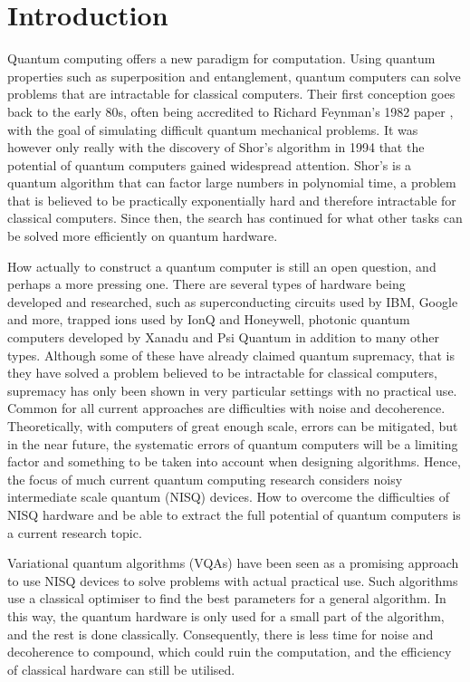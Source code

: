\chapter{Introduction}
\label{chap:intro}
Quantum computing offers a new paradigm for computation.
Using quantum properties such as superposition and entanglement, quantum computers can solve problems that are intractable for classical computers.
Their first conception goes back to the early 80s, often being accredited to Richard Feynman's 1982 paper \cite{feynman1982}, with the goal of simulating difficult quantum mechanical problems.
It was however only really with the discovery of Shor's algorithm in 1994 \cite{shor1994} that the potential of quantum computers gained widespread attention.
Shor's is a quantum algorithm that can factor large numbers in polynomial time, a problem that is believed to be practically exponentially hard and therefore intractable for classical computers.
Since then, the search has continued for what other tasks can be solved more efficiently on quantum hardware.

How actually to construct a quantum computer is still an open question, and perhaps a more pressing one.
There are several types of hardware being developed and researched, such as superconducting circuits used by IBM, Google and more, trapped ions used by IonQ and Honeywell, photonic quantum computers developed by Xanadu and Psi Quantum in addition to many other types.
Although some of these have already claimed quantum supremacy, that is they have solved a problem believed to be intractable for classical computers, supremacy has only been shown in very particular settings with no practical use.
Common for all current approaches are difficulties with noise and decoherence.
Theoretically, with computers of great enough scale, errors can be mitigated, but in the near future, the systematic errors of quantum computers will be a limiting factor and something to be taken into account when designing algorithms.
Hence, the focus of much current quantum computing research considers noisy intermediate scale quantum (NISQ) devices.
How to overcome the difficulties of NISQ hardware and be able to extract the full potential of quantum computers is a current research topic.

Variational quantum algorithms (VQAs) have been seen as a promising approach to use NISQ devices to solve problems with actual practical use.
Such algorithms use a classical optimiser to find the best parameters for a general algorithm.
In this way, the quantum hardware is only used for a small part of the algorithm, and the rest is done classically.
Consequently, there is less time for noise and decoherence to compound, which could ruin the computation, and the efficiency of classical hardware can still be utilised.

